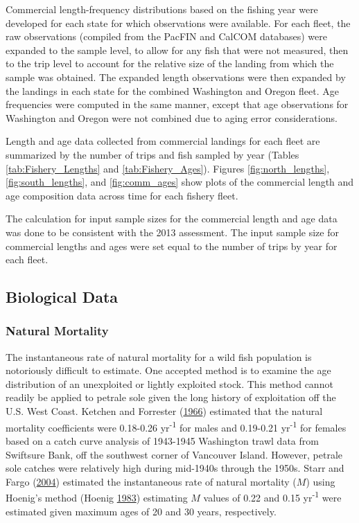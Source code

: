 \documentclass[12pt,]{article}
\begin{document}
Commercial length-frequency distributions based on the fishing year were
developed for each state for which observations were available. For each
fleet, the raw observations (compiled from the PacFIN and CalCOM
databases) were expanded to the sample level, to allow for any fish that
were not measured, then to the trip level to account for the relative
size of the landing from which the sample was obtained. The expanded
length observations were then expanded by the landings in each state for
the combined Washington and Oregon fleet. Age frequencies were computed
in the same manner, except that age observations for Washington and
Oregon were not combined due to aging error considerations.

Length and age data collected from commercial landings for each fleet
are summarized by the number of trips and fish sampled by year (Tables
\ref{tab:Fishery_Lengths} and \ref{tab:Fishery_Ages}). Figures
\ref{fig:north_lengths}, \ref{fig:south_lengths}, and
\ref{fig:comm_ages} show plots of the commercial length and age
composition data across time for each fishery fleet.

The calculation for input sample sizes for the commercial length and age
data was done to be consistent with the 2013 assessment. The input
sample size for commercial lengths and ages were set equal to the number
of trips by year for each fleet.

\subsection{Biological Data}\label{biological-data}

\subsubsection{Natural Mortality}\label{natural-mortality}

The instantaneous rate of natural mortality for a wild fish population
is notoriously difficult to estimate. One accepted method is to examine
the age distribution of an unexploited or lightly exploited stock. This
method cannot readily be applied to petrale sole given the long history
of exploitation off the U.S. West Coast. Ketchen and Forrester
(\protect\hyperlink{ref-ketchen_population_1966}{1966}) estimated that
the natural mortality coefficients were 0.18-0.26 yr\textsuperscript{-1}
for males and 0.19-0.21 yr\textsuperscript{-1} for females based on a
catch curve analysis of 1943-1945 Washington trawl data from Swiftsure
Bank, off the southwest corner of Vancouver Island. However, petrale
sole catches were relatively high during mid-1940s through the 1950s.
Starr and Fargo (\protect\hyperlink{ref-starr_petrale_2004}{2004})
estimated the instantaneous rate of natural mortality (\(M\)) using
Hoenig's method (Hoenig
\protect\hyperlink{ref-hoenig_empirical_1983}{1983}) estimating \(M\)
values of 0.22 and 0.15 yr\textsuperscript{-1} were estimated given
maximum ages of 20 and 30 years, respectively.
\end{document}
